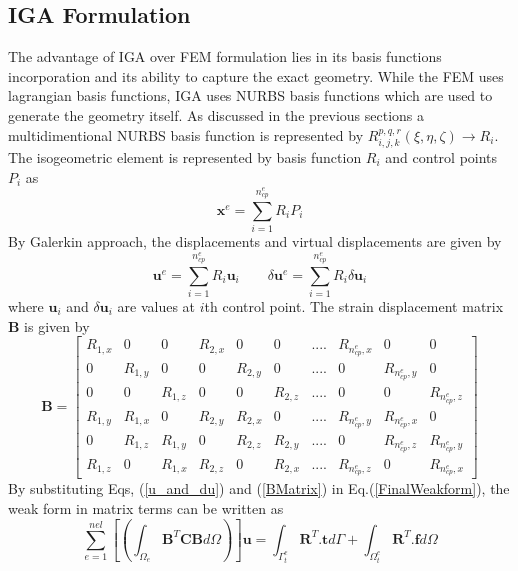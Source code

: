 \documentclass[11pt]{article}
\begin{document}
\subsection{IGA Formulation}
The advantage of IGA over FEM formulation lies in its basis functions
incorporation and its ability to capture the exact geometry. While the FEM uses
lagrangian basis functions, IGA uses NURBS basis functions which are used to
generate the geometry itself. As discussed in the previous sections a
multidimentional NURBS basis function is represented by
$R_{i,j,k}^{p,q,r}(\xi,\eta,\zeta) \rightarrow R_i$. The isogeometric element 
is represented by basis function $R_i$ and control points $P_i$ as \cite{agrawal2019iga}
\begin{equation} \label{Co-ordinate}
\textbf{x}^e = \sum_{i=1}^{n_{cp}^e} R_i P_i
\end{equation} 
By Galerkin approach, the displacements and virtual displacements are given by
\begin{equation} \label{u_and_du}
\textbf{u}^e = \sum_{i=1}^{n_{cp}^e} R_i \textbf{u}_i \qquad \delta\textbf{u}^e
= \sum_{i=1}^{n_{cp}^e} R_i \delta\textbf{u}_i
\end{equation}
where $\textbf{u}_i$ and $\delta\textbf{u}_i$ are values at $i$th control point.
The strain displacement matrix \textbf{B} is given by
\begin{equation} \label{BMatrix}
\textbf{B} =
\begin{bmatrix}
R_{1,x} & 0 & 0 & R_{2,x} & 0 & 0 & .... & R_{n_{cp}^e,x} & 0 & 0 \\
0 &R_{1,y} & 0 & 0 & R_{2,y} & 0 & .... & 0 & R_{n_{cp}^e,y} & 0  \\
0 & 0 & R_{1,z} &0 & 0 & R_{2,z} & .... &0 & 0 & R_{n_{cp}^e,z}  \\
R_{1,y} & R_{1,x} & 0 & R_{2,y} & R_{2,x} & 0 & .... & R_{n_{cp}^e,y} &
R_{n_{cp}^e,x} & 0 \\
0 & R_{1,z} & R_{1,y} & 0 & R_{2,z} & R_{2,y} & .... & 0 & R_{n_{cp}^e,z} &
R_{n_{cp}^e,y}\\
R_{1,z} &0 & R_{1,x} & R_{2,z} &0 & R_{2,x} & .... &R_{n_{cp}^e,z} &0
&R_{n_{cp}^e,x}
\end{bmatrix}
\end{equation}
By substituting Eqs, (\ref{u_and_du}) and (\ref{BMatrix}) in
Eq.(\ref{FinalWeakform}), the weak form in matrix terms can be written as
\begin{equation} \label{MatrixWeakForm}
\sum_{e=1}^{nel} \left[ \left( \int_{\Omega_e} \textbf{B}^T \textbf{C}
\textbf{B} d\Omega \right) \right] \textbf{u} = \int_{\Gamma^e_t}
\textbf{R}^T.\textbf{t} d\Gamma + \int_{\Omega^e_t} \textbf{R}^T.\textbf{f}
d\Omega 
\end{equation}
\end{document}

